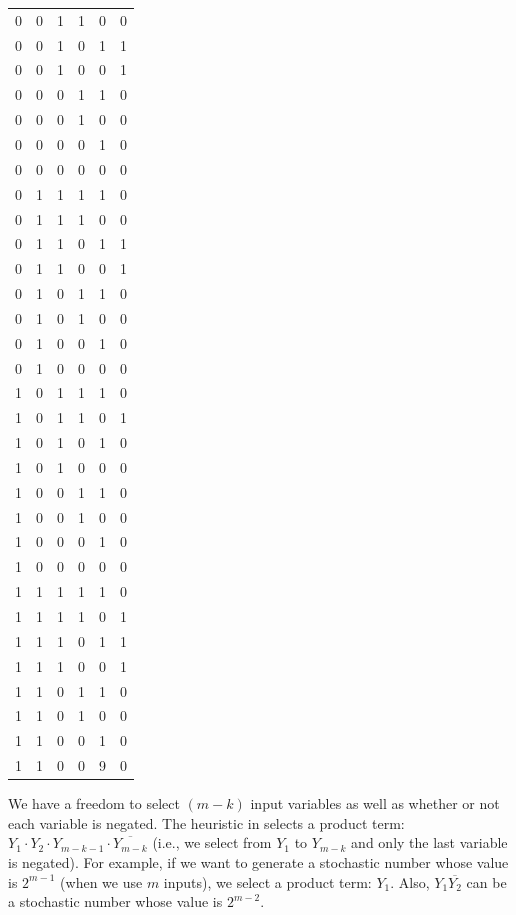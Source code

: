 \documentclass[10pt,conference]{IEEEtran}
\begin{document}
\begin{table}[t]
{\begin{minipage}[b]{0.22\textwidth}
\begin{tabular}{c c |c c c | c}
        0 &0 &1 &1 &0 &0\\ 
        0 &0 &1 &0 &1 &1\\ 
        0 &0 &1 &0 &0 &1\\ 
        0 &0 &0 &1 &1 &0\\ 
        0 &0 &0 &1 &0 &0\\ 
        0 &0 &0 &0 &1 &0\\ 
        0 &0 &0 &0 &0 &0\\ \hline
        0 &1 &1 &1 &1 &0\\ 
        0 &1 &1 &1 &0 &0\\ 
        0 &1 &1 &0 &1 &1\\ 
        0 &1 &1 &0 &0 &1\\ 
        0 &1 &0 &1 &1 &0\\ 
        0 &1 &0 &1 &0 &0\\ 
        0 &1 &0 &0 &1 &0\\ 
        0 &1 &0 &0 &0 &0\\ \hline
        1 &0 &1 &1 &1 &0\\ 
        1 &0 &1 &1 &0 &1\\ 
        1 &0 &1 &0 &1 &0\\ 
        1 &0 &1 &0 &0 &0\\ 
        1 &0 &0 &1 &1 &0\\ 
        1 &0 &0 &1 &0 &0\\ 
        1 &0 &0 &0 &1 &0\\ 
        1 &0 &0 &0 &0 &0\\ \hline 
        1 &1 &1 &1 &1 &0\\ 
        1 &1 &1 &1 &0 &1\\ 
        1 &1 &1 &0 &1 &1\\ 
        1 &1 &1 &0 &0 &1\\ 
        1 &1 &0 &1 &1 &0\\ 
        1 &1 &0 &1 &0 &0\\ 
        1 &1 &0 &0 &1 &0\\ 
        1 &1 &0 &0 &9 &0\\ \hline 
    \end{tabular}
    \end{minipage}}
\end{table}
\par
We have a freedom to select $(m-k)$ input variables as well
as whether or not each variable is negated. The heuristic in  \cite{fifteen}
selects a product term: $Y_1 \cdot Y_2 \cdot Y_{m-k-1} \cdot \overline{Y_{m-k}}$ (i.e., we select
from $Y_1$ to $Y_{m-k}$ and only the last variable is negated). For
example, if we want to generate a stochastic number whose
value is ${2}^{m-1}$ (when we use $m$ inputs), we select a product
term: $Y_1$. Also, $Y_1\overline{Y_2}$ can be a stochastic number whose value
is ${2}^{m-2}$.
\end{document}
